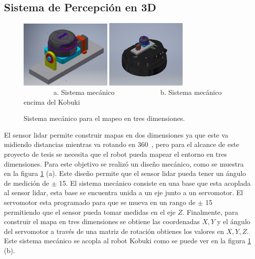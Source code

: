 \subsection{Sistema de Percepci\'on en 3D}
\begin{figure}%
  \centering \footnotesize
  \includegraphics[width=0.40\textwidth]{images/lidar_3D.jpeg}
  \includegraphics[width=0.35\textwidth]{images/kbki_lidar3D.jpeg}
  \\ $\qquad\qquad$ a. Sistema mecánico  $\qquad\qquad\qquad$  b. Sistema mecánico encima del Kobuki
  \captionsetup{font=footnotesize}
  \caption{Sistema mec\'anico para el mapeo en tres dimensiones.}
  \label{f:lidar3D}
\end{figure}
El sensor lidar permite construir mapas en dos dimensiones ya que este va midiendo 
distancias mientras va rotando en 360\grad ~, pero para el alcance de este proyecto de 
tesis se necesita que el robot pueda mapear el entorno en tres dimensiones. Para este
objetivo se realizó un diseño mecánico, como se muestra en la figura \ref{f:lidar3D} (a). Este
diseño permite que el sensor lidar pueda tener un ángulo de medición de $\pm$ 15\grad. El sistema
mecánico consiste en una base que esta acoplada al sensor lidar, esta base se encuentra unida
a un eje junto a un servomotor. El servomotor esta programado para que se mueva en un rango de
$\pm$ 15\grad~ permitiendo que el sensor pueda tomar medidas en el eje $Z$. Finalmente, para construir
el mapa en tres dimensiones se obtiene las coordenadas $X,Y$ y el ángulo del servomotor a través de 
una matriz de rotación obtienes los valores en $X,Y,Z$. Este sistema mecánico se acopla al robot Kobuki
como se puede ver en la figura \ref{f:lidar3D} (b).


